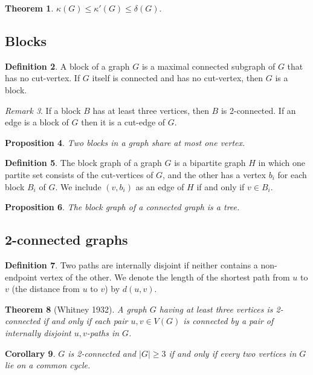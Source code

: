 \documentclass[11pt, fleqn, a4paper, landscape]{article}
\theoremstyle{plain} %
\newtheorem{thm}{Theorem}
\newtheorem{pro}[thm]{Proposition}
\newtheorem{cor}[thm]{Corollary}
\theoremstyle{remark} %
\newtheorem{rem}[thm]{Remark}
\theoremstyle{definition} %
\newtheorem{defi}[thm]{Definition}
\begin{document}
\begin{multicols}{3}
\begin{thm}
$\kappa (G) \le \kappa'(G) \le \delta(G).$
\end{thm}

\subsection{Blocks}
\begin{defi}
A block of a graph $G$ is a maximal connected subgraph of $G$ that has no cut-vertex.
If $G$ itself is connected and has no cut-vertex, then $G$ is a block.
\end{defi}
\addtocounter{thm}{1}
\begin{rem}
If a block $B$ has at least three vertices, then $B$ is 2-connected. If an edge is a block of $G$ then it is a cut-edge of $G$.
\end{rem}

\begin{pro}
Two blocks in a graph share at most one vertex.
\end{pro}

\begin{defi}
The block graph of a graph $G$ is a bipartite graph $H$ in which one partite set consists of the cut-vertices of $G$, and the other has a vertex $b_i$ for each block $B_i$ of $G$. We include $(v, b_i)$ as an edge of $H$ if and only if $v \in B_i.$
\end{defi}
\addtocounter{thm}{1}
\begin{pro}
The block graph of a connected graph is a tree.
\end{pro}

\subsection{2-connected graphs}

\begin{defi}
Two paths are internally disjoint if neither contains a non-endpoint vertex of the other. We denote the length of the shortest path from $u$ to $v$ (the distance from $u$ to $v$) by $d(u, v)$.
\end{defi}

\begin{thm}[Whitney 1932]
A graph $G$ having at least three vertices is 2-connected if and only
if each pair $u, v \in V (G)$ is connected by a pair of internally disjoint $u, v$-paths in $G$.
\end{thm}

\begin{cor}
$G$ is 2-connected and $|G|\ge 3$ if and only if every two vertices in $G$ lie on a common cycle.
\end{cor}

\end{multicols}
\end{document}
